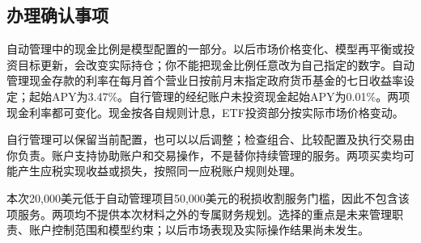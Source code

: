 \documentclass[UTF8,fontset=none,11pt,a4paper]{ctexart}
\begin{document}
\subsection*{办理确认事项}
自动管理中的现金比例是模型配置的一部分。以后市场价格变化、模型再平衡或投资目标更新，会改变实际持仓；你不能把现金比例任意改为自己指定的数字。自动管理现金存款的利率在每月首个营业日按前月末指定政府货币基金的七日收益率设定；起始APY为3.47\%。自行管理的经纪账户未投资现金起始APY为0.01\%。两项现金利率都可变化。现金按各自规则计息，ETF投资部分按实际市场价格变动。


自行管理可以保留当前配置，也可以以后调整；检查组合、比较配置及执行交易由你负责。账户支持协助账户和交易操作，不是替你持续管理的服务。两项买卖均可能产生应税实现收益或损失，按照同一应税账户规则处理。


本次20,000美元低于自动管理项目50,000美元的税损收割服务门槛，因此不包含该项服务。两项均不提供本次材料之外的专属财务规划。选择的重点是未来管理职责、账户控制范围和模型约束；以后市场表现及实际操作结果尚未发生。
\end{document}
